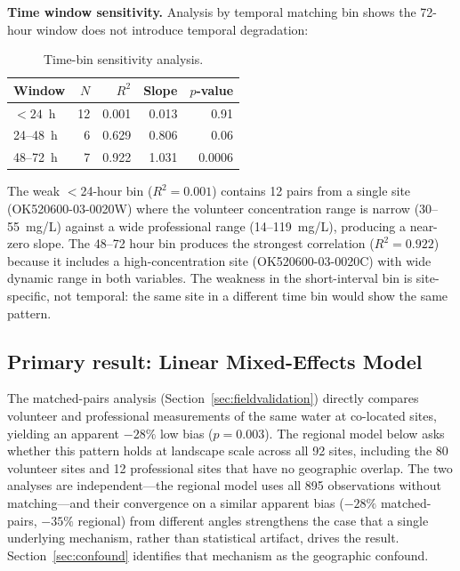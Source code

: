 \documentclass[lineno]{wlpeerj}
\begin{document}
\textbf{Time window sensitivity.} Analysis by temporal matching bin shows the 72-hour window does not introduce temporal degradation:

\begin{table}[ht]
\centering
\caption{Time-bin sensitivity analysis.}
\label{tab:timebin}
\begin{tabular}{l r r r r}
\toprule
Window & $N$ & $R^{2}$ & Slope & $p$-value \\
\midrule
$< 24$~h & 12 & 0.001 & 0.013 & 0.91 \\
24--48~h & 6 & 0.629 & 0.806 & 0.06 \\
48--72~h & 7 & 0.922 & 1.031 & 0.0006 \\
\bottomrule
\end{tabular}
\end{table}

The weak $<$24-hour bin ($R^{2} = 0.001$) contains 12 pairs from a single site (OK520600-03-0020W) where the volunteer concentration range is narrow (30--55~mg/L) against a wide professional range (14--119~mg/L), producing a near-zero slope. The 48--72 hour bin produces the strongest correlation ($R^{2} = 0.922$) because it includes a high-concentration site (OK520600-03-0020C) with wide dynamic range in both variables. The weakness in the short-interval bin is site-specific, not temporal: the same site in a different time bin would show the same pattern.

\subsection{Primary result: Linear Mixed-Effects Model}
\label{sec:primaryresult}

The matched-pairs analysis (Section~\ref{sec:fieldvalidation}) directly compares volunteer and professional measurements of the same water at co-located sites, yielding an apparent $-28\%$ low bias ($p = 0.003$). The regional model below asks whether this pattern holds at landscape scale across all 92 sites, including the 80 volunteer sites and 12 professional sites that have no geographic overlap. The two analyses are independent---the regional model uses all 895 observations without matching---and their convergence on a similar apparent bias ($-28\%$ matched-pairs, $-35\%$ regional) from different angles strengthens the case that a single underlying mechanism, rather than statistical artifact, drives the result. Section~\ref{sec:confound} identifies that mechanism as the geographic confound.
\end{document}
